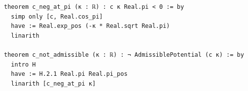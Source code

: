 \begin{Verbatim}[fontsize=\scriptsize,frame=single,framesep=1.5mm]
theorem c_neg_at_pi (κ : ℝ) : c κ Real.pi < 0 := by
  simp only [c, Real.cos_pi]
  have := Real.exp_pos (-κ * Real.sqrt Real.pi)
  linarith

theorem c_not_admissible (κ : ℝ) : ¬ AdmissiblePotential (c κ) := by
  intro H
  have := H.2.1 Real.pi Real.pi_pos
  linarith [c_neg_at_pi κ]
\end{Verbatim}

